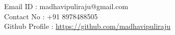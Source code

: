 \documentclass{resume} %
\newcommand{\blank}[1]{\hspace*{#1}}
\begin{document}
\blank{5 cm}
{Email ID} \blank{0.7 cm} :
madhavipuliraju@gmail.com \\
\blank{5 cm} 
{Contact No} \blank{0.3 cm} :
+91 8978488505 \\
\blank{5 cm}
{Github Profile : }
\url{https://github.com/madhavipuliraju}
\sectionlineskip \hfill


  


\end{document}
